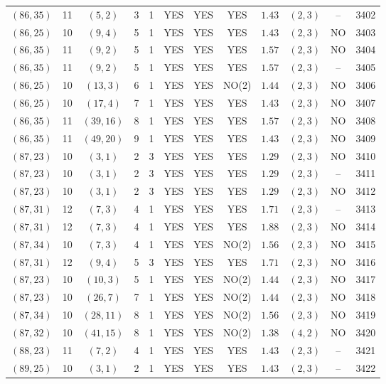 \begin{longtable}{|c|c|c|c|c|c|c|c|c|c|c|c|}
$(86,35)$ & 11 & $(5,2)$ & 3 & 1 & YES & YES & YES & $1.43$ & $(2,3)$ & -- & 3402\\
$(86,25)$ & 10 & $(9,4)$ & 5 & 1 & YES & YES & YES & $1.43$ & $(2,3)$ & NO & 3403\\
$(86,35)$ & 11 & $(9,2)$ & 5 & 1 & YES & YES & YES & $1.57$ & $(2,3)$ & NO & 3404\\
$(86,35)$ & 11 & $(9,2)$ & 5 & 1 & YES & YES & YES & $1.57$ & $(2,3)$ & -- & 3405\\
$(86,25)$ & 10 & $(13,3)$ & 6 & 1 & YES & YES & NO(2) & $1.44$ & $(2,3)$ & NO & 3406\\
$(86,25)$ & 10 & $(17,4)$ & 7 & 1 & YES & YES & YES & $1.43$ & $(2,3)$ & NO & 3407\\
$(86,35)$ & 11 & $(39,16)$ & 8 & 1 & YES & YES & YES & $1.57$ & $(2,3)$ & NO & 3408\\
$(86,35)$ & 11 & $(49,20)$ & 9 & 1 & YES & YES & YES & $1.43$ & $(2,3)$ & NO & 3409\\
$(87,23)$ & 10 & $(3,1)$ & 2 & 3 & YES & YES & YES & $1.29$ & $(2,3)$ & NO & 3410\\
$(87,23)$ & 10 & $(3,1)$ & 2 & 3 & YES & YES & YES & $1.29$ & $(2,3)$ & -- & 3411\\
$(87,23)$ & 10 & $(3,1)$ & 2 & 3 & YES & YES & YES & $1.29$ & $(2,3)$ & NO & 3412\\
$(87,31)$ & 12 & $(7,3)$ & 4 & 1 & YES & YES & YES & $1.71$ & $(2,3)$ & -- & 3413\\
$(87,31)$ & 12 & $(7,3)$ & 4 & 1 & YES & YES & YES & $1.88$ & $(2,3)$ & NO & 3414\\
$(87,34)$ & 10 & $(7,3)$ & 4 & 1 & YES & YES & NO(2) & $1.56$ & $(2,3)$ & NO & 3415\\
$(87,31)$ & 12 & $(9,4)$ & 5 & 3 & YES & YES & YES & $1.71$ & $(2,3)$ & NO & 3416\\
$(87,23)$ & 10 & $(10,3)$ & 5 & 1 & YES & YES & NO(2) & $1.44$ & $(2,3)$ & NO & 3417\\
$(87,23)$ & 10 & $(26,7)$ & 7 & 1 & YES & YES & NO(2) & $1.44$ & $(2,3)$ & NO & 3418\\
$(87,34)$ & 10 & $(28,11)$ & 8 & 1 & YES & YES & NO(2) & $1.56$ & $(2,3)$ & NO & 3419\\
$(87,32)$ & 10 & $(41,15)$ & 8 & 1 & YES & YES & NO(2) & $1.38$ & $(4,2)$ & NO & 3420\\
$(88,23)$ & 11 & $(7,2)$ & 4 & 1 & YES & YES & YES & $1.43$ & $(2,3)$ & -- & 3421\\
$(89,25)$ & 10 & $(3,1)$ & 2 & 1 & YES & YES & YES & $1.43$ & $(2,3)$ & -- & 3422\\

\end{longtable}
